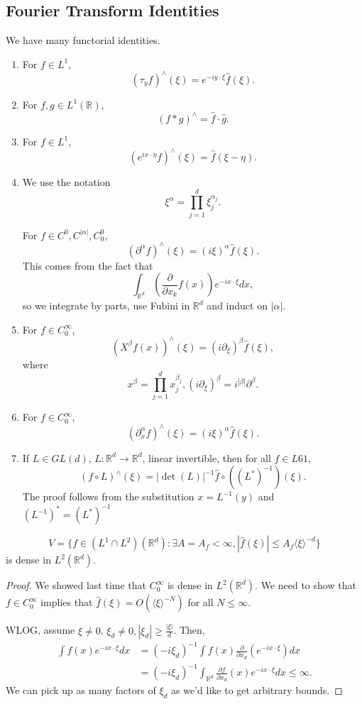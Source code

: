 \documentclass[11pt]{scrartcl}
\newcommand{\R}{\mathbb{R}}
\let \hat \widehat
\newcommand{\<}{\langle}
\renewcommand{\>}{\rangle}
\begin{document}
\subsection{Fourier Transform Identities}
We have many functorial identities.
\begin{enumerate}
\item For $f \in L^1$, $$(\tau_y f)^{\wedge}(\xi) = e^{-iy \cdot \xi}\hat{f}(\xi).$$
\item For $f, g \in L^1(\R)$, $$(f * g)^{\wedge} = \hat{f} \cdot \hat{g}.$$
\item For $f \in L^1$, $$(e^{ix \cdot \eta}f)^{\wedge}(\xi) = \hat{f}(\xi - \eta).$$
\item We use the notation $$\xi^{\alpha} = \prod_{j=1}^d \xi_j^{\alpha_j}.$$

For $f \in C^0, C^{|\alpha|}, C_0^0$, 
$$(\partial^{\alpha} f)^{\wedge}(\xi) = (i\xi)^{\alpha}\hat{f}(\xi).$$
This comes from the fact that 
$$\int_{\R^d} \left (\frac{\partial}{\partial x_k}f(x)\right) e^{-ix \cdot \xi}dx,$$
so we integrate by parts, use Fubini in $\R^d$ and induct on $|\alpha|$.

\item For $f \in C_0^{\infty}$, $$(X^\beta f(x))^\wedge(\xi) = (i\partial_{\xi})^{\beta}\hat{f}(\xi),$$
where
$$x^\beta = \prod_{j=1}^d x_j^{\beta_j}, (i\partial_\xi)^{\beta} = i^{|\beta|}\partial^{\beta}.$$
\item For $f \in C_0^{\infty}$, $$(\partial_x^{\alpha}f)^{\wedge}(\xi) = (i\xi)^{\alpha}\hat{f}(\xi).$$
\item If $L \in GL(d)$, $L : \R^d \rightarrow \R^d$, linear invertible, then for all $f \in L61$,
$$(f \circ L)^{\wedge}(\xi) = |\det(L)|^{-1} \hat{f}\circ((L^*)^{-1})(\xi).$$
The proof follows from the substitution $x = L^{-1}(y)$ and $(L^{-1})^* = (L^*)^{-1}$
\end{enumerate}
\begin{corollary} $$V = \{f \in (L^1 \cap L^2)(\R^d): \exists A = A_f < \infty, |\hat{f}(\xi)| \le A_f\< \xi \> ^{-d}\}$$ is dense in $L^2(\R^d)$.
\end{corollary}
\begin{proof}
We showed last time that $C_0^{\infty}$ is dense in $L^2(\R^d)$.  We need to show that $f \in C_0^{\infty}$ implies that $\hat{f}(\xi) = O(\<\xi\>^{-N})$ for all $N \le \infty$.  

WLOG, assume $\xi \ne 0$, $\xi_d \ne 0, |\xi_d| \ge \frac{|\xi|}{d}$. Then, 
\begin{align*}
\int f(x) e^{-ix\cdot \xi}dx  &= (-i \xi_d)^{-1}\int f(x) \frac{\partial}{\partial x_d}(e^{-ix\cdot \xi})dx \\
&= (-i \xi_d)^{-1} \int_{\R^d} \frac{\partial f}{\partial x_d}(x) e^{-ix \cdot \xi}dx \le \infty.
\end{align*}
We can pick up as many factors of $\xi_d$ as we'd like to get arbitrary bounds.
\end{proof}
\end{document}
